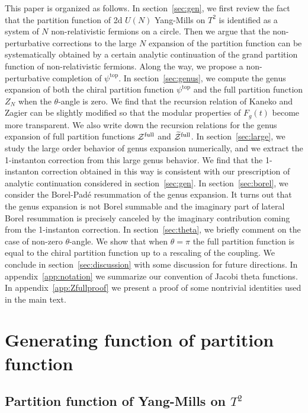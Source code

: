 \documentclass[11pt]{article}
\def\th{\theta}
\renewcommand{\[}{\begin{eqnarray}}
\renewcommand{\]}{\end{eqnarray}}
\newcommand{\Zefull}{{\cal Z}^{\text{full}}}
\newcommand{\Zofull}{{\widetilde{\cal Z}}^{\text{full}}}
\begin{document}
This paper is organized as follows.
In section~\ref{sec:gen}, 
we first review the fact that the
partition function of 2d $U(N)$ Yang-Mills on $T^2$
is identified as a system of $N$ non-relativistic fermions
on a circle. Then we argue 
that the non-perturbative corrections
to the large $N$ expansion of 
the partition function can be systematically obtained 
by a certain analytic continuation of the grand partition 
function of non-relativistic fermions.
Along the way, we propose a non-perturbative completion
of $\psi^{\text{top}}$. 
In section~\ref{sec:genus},
we compute the genus expansion of both the chiral partition function
$\psi^{\text{top}}$ and the full partition function
$Z_N$ when the $\th$-angle is zero.
We find that  
the recursion relation of Kaneko and Zagier
can be slightly modified so that the modular properties
of $F_g(t)$ become more transparent.
We also write down the recursion relations
for the genus expansion of full partition functions
$\Zefull$ and $\Zofull$.
In section~\ref{sec:large}, we study the large order behavior 
of genus expansion numerically, and we extract the
1-instanton correction from this large genus behavior.
We find that the 1-instanton correction obtained in this way 
is consistent with our prescription of analytic continuation
considered in section~\ref{sec:gen}.
In section~\ref{sec:borel},
we consider the Borel-Pad\'{e} resummation
of the genus expansion.
It turns out that 
the genus expansion is not Borel summable and
the imaginary part of lateral Borel resummation is precisely
canceled by the imaginary contribution 
coming from the 1-instanton correction.
In section~\ref{sec:theta}, we briefly comment on the case of
non-zero $\th$-angle. We show that when $\th=\pi$
the full partition function is equal to 
the chiral partition function up to a rescaling of the coupling.
We conclude in section~\ref{sec:discussion}
with some discussion for future directions.
In appendix~\ref{app:notation} we summarize our convention of Jacobi theta functions.
In appendix~\ref{app:Zfullproof} we present a proof of some nontrivial
identities used in the main text.


\section{Generating function of partition function\label{sec:gen}}

\subsection{Partition function of Yang-Mills on $T^2$}
\end{document}
